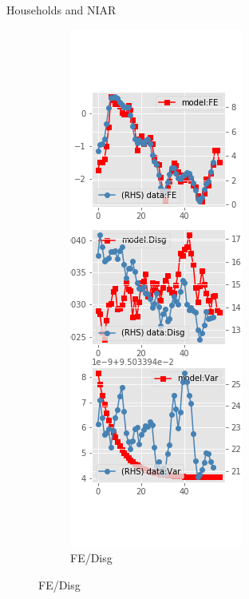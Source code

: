 \documentclass{beamer}
\begin{document}
\begin{frame}{Households and NIAR}
\begin{figure}[ht]
\begin{subfigure}[b]{0.2\textwidth}
		\end{subfigure}
		\hfill
		\begin{subfigure}[b]{0.2\textwidth}
			\caption{FE/Disg}
			\includegraphics[width=\textwidth, height = 0.8\textheight]{figuresDraft/sce_ni_est_diag1.png}

\end{subfigure}
\end{figure}
\end{frame}
\end{document}

